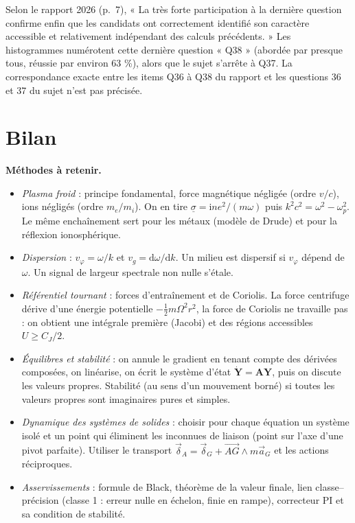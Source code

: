 \documentclass[11pt,a4paper]{article}
\providecommand{\tightlist}{\setlength{\itemsep}{0pt}\setlength{\parskip}{0pt}}
\begin{document}
\begin{jury}

Selon le rapport 2026 (p.~7), « La très forte participation à la dernière question confirme enfin que les candidats ont correctement identifié son caractère accessible et relativement indépendant des calculs précédents. » Les histogrammes numérotent cette dernière question « Q38 » (abordée par presque tous, réussie par environ 63 \%), alors que le sujet s'arrête à Q37. La correspondance exacte entre les items Q36 à Q38 du rapport et les questions 36 et 37 du sujet n'est pas précisée.

\end{jury}

\hypertarget{bilan}{%
\section{Bilan}\label{bilan}}

\textbf{Méthodes à retenir.}

\begin{itemize}
\tightlist
\item
  \emph{Plasma froid} : principe fondamental, force magnétique négligée (ordre \(v/c\)), ions négligés (ordre \(m_e/m_i\)). On en tire \(\underline\sigma=\mathrm i n e^2/(m\omega)\) puis \(k^2c^2=\omega^2-\omega_p^2\). Le même enchaînement sert pour les métaux (modèle de Drude) et pour la réflexion ionosphérique.
\item
  \emph{Dispersion} : \(v_\varphi=\omega/k\) et \(v_g=\mathrm d\omega/\mathrm dk\). Un milieu est dispersif si \(v_\varphi\) dépend de \(\omega\). Un signal de largeur spectrale non nulle s'étale.
\item
  \emph{Référentiel tournant} : forces d'entraînement et de Coriolis. La force centrifuge dérive d'une énergie potentielle \(-\frac12m\Omega^2r^2\), la force de Coriolis ne travaille pas : on obtient une intégrale première (Jacobi) et des régions accessibles \(U\ge C_J/2\).
\item
  \emph{Équilibres et stabilité} : on annule le gradient en tenant compte des dérivées composées, on linéarise, on écrit le système d'état \(\dot{\mathbf Y}=\mathbf A\mathbf Y\), puis on discute les valeurs propres. Stabilité (au sens d'un mouvement borné) si toutes les valeurs propres sont imaginaires pures et simples.
\item
  \emph{Dynamique des systèmes de solides} : choisir pour chaque équation un système isolé et un point qui éliminent les inconnues de liaison (point sur l'axe d'une pivot parfaite). Utiliser le transport \(\vec\delta_A=\vec\delta_G+\overrightarrow{AG}\wedge m\vec a_G\) et les actions réciproques.
\item
  \emph{Asservissements} : formule de Black, théorème de la valeur finale, lien classe--précision (classe 1 : erreur nulle en échelon, finie en rampe), correcteur PI et sa condition de stabilité.
\end{itemize}
\end{document}
